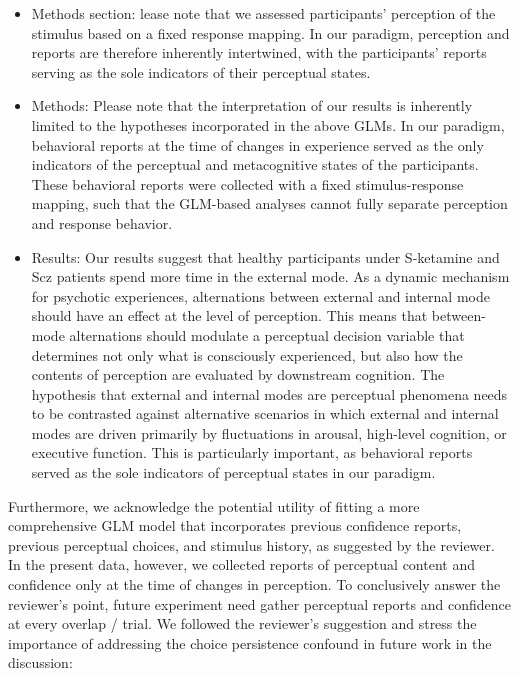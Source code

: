 \documentclass[
]{article}
\begin{document}
\begin{itemize}
\item
  Methods section: lease note that we assessed participants' perception
  of the stimulus based on a fixed response mapping. In our paradigm,
  perception and reports are therefore inherently intertwined, with the
  participants' reports serving as the sole indicators of their
  perceptual states.
\item
  Methods: Please note that the interpretation of our results is
  inherently limited to the hypotheses incorporated in the above GLMs.
  In our paradigm, behavioral reports at the time of changes in
  experience served as the only indicators of the perceptual and
  metacognitive states of the participants. These behavioral reports
  were collected with a fixed stimulus-response mapping, such that the
  GLM-based analyses cannot fully separate perception and response
  behavior.
\item
  Results: Our results suggest that healthy participants under
  S-ketamine and Scz patients spend more time in the external mode. As a
  dynamic mechanism for psychotic experiences, alternations between
  external and internal mode should have an effect at the level of
  perception. This means that between-mode alternations should modulate
  a perceptual decision variable that determines not only what is
  consciously experienced, but also how the contents of perception are
  evaluated by downstream cognition. The hypothesis that external and
  internal modes are perceptual phenomena needs to be contrasted against
  alternative scenarios in which external and internal modes are driven
  primarily by fluctuations in arousal, high-level cognition, or
  executive function. This is particularly important, as behavioral
  reports served as the sole indicators of perceptual states in our
  paradigm.
\end{itemize}

Furthermore, we acknowledge the potential utility of fitting a more
comprehensive GLM model that incorporates previous confidence reports,
previous perceptual choices, and stimulus history, as suggested by the
reviewer. In the present data, however, we collected reports of
perceptual content and confidence only at the time of changes in
perception. To conclusively answer the reviewer's point, future
experiment need gather perceptual reports and confidence at every
overlap / trial. We followed the reviewer's suggestion and stress the
importance of addressing the choice persistence confound in future work
in the discussion:
\end{document}
